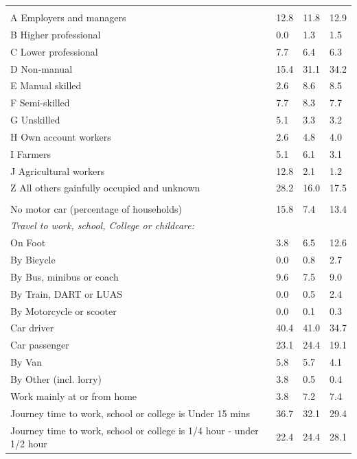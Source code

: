 \documentclass{article}
\begin{document}
\begin{table}[h]
\begin{tabular}{KTTT}
\hline
    \\ 
    \hline
A Employers and managers & 12.8& 11.8& 12.9\\
B Higher professional & 0.0& 1.3& 1.5\\
C Lower professional & 7.7& 6.4& 6.3\\
D Non-manual & 15.4& 31.1& 34.2\\
E Manual skilled & 2.6& 8.6& 8.5\\
F Semi-skilled & 7.7& 8.3& 7.7\\
G Unskilled & 5.1& 3.3& 3.2\\
H Own account workers & 2.6& 4.8& 4.0\\
I Farmers & 5.1& 6.1& 3.1\\
J Agricultural workers & 12.8&  2.1&  1.2\\
Z All others gainfully occupied and unknown & 28.2& 16.0& 17.5\\
\hline
{}\hline
    \\ 
    \hline
No motor car (percentage of households) & 15.8&  7.4& 
13.4\\
    \hline
\emph{Travel to work, school, College or childcare:} & & & \\
\quad On Foot &  3.8&  6.5& 12.6\\
\quad By Bicycle & 0.0& 0.8& 2.7\\
\quad By Bus, minibus or coach & 9.6& 7.5& 9.0\\
\quad By Train, DART or LUAS & 0.0& 0.5& 2.4\\
\quad By Motorcycle or scooter & 0.0& 0.1& 0.3\\
\quad Car driver & 40.4& 41.0& 34.7\\
\quad Car passenger & 23.1& 24.4& 19.1\\
\quad By Van & 5.8& 5.7& 4.1\\
\quad By Other (incl. lorry) & 3.8& 0.5& 0.4\\
    \hline
Work mainly at or from home & 3.8& 7.2& 7.4\\
Journey time to work, school or college is Under 15 mins & 36.7& 32.1& 29.4\\
Journey time to work, school or college is 1/4 hour - under 1/2 hour & 22.4& 24.4& 28.1\\

\end{tabular}
\end{table}
\end{document}
